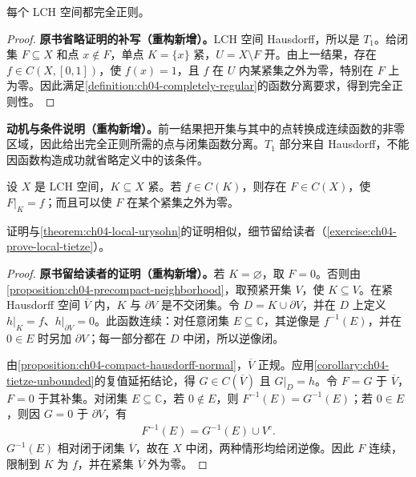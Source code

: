 \documentclass[../../main.tex]{subfiles}%
\begin{document}
\begin{corollary}\label{corollary:ch04-lch-completely-regular}
每个 LCH 空间都完全正则。
\end{corollary}
\begin{proof}
\textbf{原书省略证明的补写（重构新增）。}LCH 空间 Hausdorff，所以是 $T_1$。给闭集 $F\subseteq X$ 和点 $x\notin F$，单点 $K=\{x\}$ 紧，$U=X\setminus F$ 开。由上一结果，存在 $f\in C(X,[0,1])$，使 $f(x)=1$，且 $f$ 在 $U$ 内某紧集之外为零，特别在 $F$ 上为零。因此满足\cref{definition:ch04-completely-regular}的函数分离要求，得到完全正则性。
\end{proof}
\begin{remark}
\textbf{动机与条件说明（重构新增）。}前一结果把开集与其中的点转换成连续函数的非零区域，因此给出完全正则所需的点与闭集函数分离。$T_1$ 部分来自 Hausdorff，不能因函数构造成功就省略定义中的该条件。
\end{remark}
\begin{theorem}\label{theorem:ch04-local-tietze}
设 $X$ 是 LCH 空间，$K\subseteq X$ 紧。若 $f\in C(K)$，则存在 $F\in C(X)$，使 $F|_K=f$；而且可以使 $F$ 在某个紧集之外为零。
\end{theorem}
证明与\cref{theorem:ch04-local-urysohn}的证明相似，细节留给读者（\cref{exercise:ch04-prove-local-tietze}）。
\begin{proof}
\textbf{原书留给读者的证明（重构新增）。}若 $K=\varnothing$，取 $F=0$。否则由\cref{proposition:ch04-precompact-neighborhood}，取预紧开集 $V$，使 $K\subseteq V$。在紧 Hausdorff 空间 $\overline V$ 内，$K$ 与 $\partial V$ 是不交闭集。令 $D=K\cup\partial V$，并在 $D$ 上定义 $h|_K=f$、$h|_{\partial V}=0$。此函数连续：对任意闭集 $E\subseteq\mathbb C$，其逆像是 $f^{-1}(E)$，并在 $0\in E$ 时另加 $\partial V$；每一部分都在 $D$ 中闭，所以逆像闭。

由\cref{proposition:ch04-compact-hausdorff-normal}，$\overline V$ 正规。应用\cref{corollary:ch04-tietze-unbounded}的复值延拓结论，得 $G\in C(\overline V)$ 且 $G|_D=h$。令 $F=G$ 于 $\overline V$，$F=0$ 于其补集。对闭集 $E\subseteq\mathbb C$，若 $0\notin E$，则 $F^{-1}(E)=G^{-1}(E)$；若 $0\in E$，则因 $G=0$ 于 $\partial V$，有
\begin{align*}
F^{-1}(E)=G^{-1}(E)\cup V^c.
\end{align*}
$G^{-1}(E)$ 相对闭于闭集 $\overline V$，故在 $X$ 中闭，两种情形均给闭逆像。因此 $F$ 连续，限制到 $K$ 为 $f$，并在紧集 $\overline V$ 外为零。
\end{proof}
\end{document}

